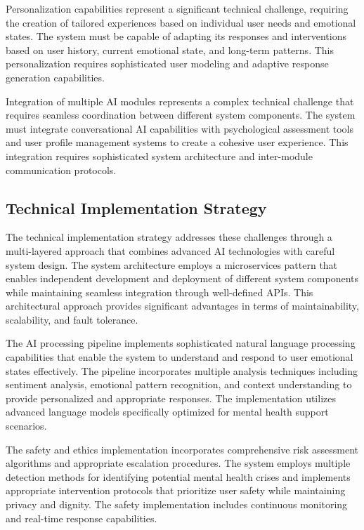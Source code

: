 Personalization capabilities represent a significant technical challenge, requiring the creation of tailored experiences based on individual user needs and emotional states. The system must be capable of adapting its responses and interventions based on user history, current emotional state, and long-term patterns. This personalization requires sophisticated user modeling and adaptive response generation capabilities.

Integration of multiple AI modules represents a complex technical challenge that requires seamless coordination between different system components. The system must integrate conversational AI capabilities with psychological assessment tools and user profile management systems to create a cohesive user experience. This integration requires sophisticated system architecture and inter-module communication protocols.

\subsection{Technical Implementation Strategy}

The technical implementation strategy addresses these challenges through a multi-layered approach that combines advanced AI technologies with careful system design. The system architecture employs a microservices pattern that enables independent development and deployment of different system components while maintaining seamless integration through well-defined APIs. This architectural approach provides significant advantages in terms of maintainability, scalability, and fault tolerance.

The AI processing pipeline implements sophisticated natural language processing capabilities that enable the system to understand and respond to user emotional states effectively. The pipeline incorporates multiple analysis techniques including sentiment analysis, emotional pattern recognition, and context understanding to provide personalized and appropriate responses. The implementation utilizes advanced language models specifically optimized for mental health support scenarios.

The safety and ethics implementation incorporates comprehensive risk assessment algorithms and appropriate escalation procedures. The system employs multiple detection methods for identifying potential mental health crises and implements appropriate intervention protocols that prioritize user safety while maintaining privacy and dignity. The safety implementation includes continuous monitoring and real-time response capabilities.

